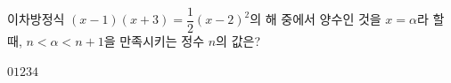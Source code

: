 이차방정식 $(x-1)(x+3)=\dfrac{1}{2}(x-2)^2$의 해 중에서 양수인 것을 $x=\alpha$라 할 때, $n<\alpha<n+1$을 만족시키는 정수 $n$의 값은?
\begin{choices32}{$0$}{$1$}{$2$}{$3$}{$4$}\end{choices32}
